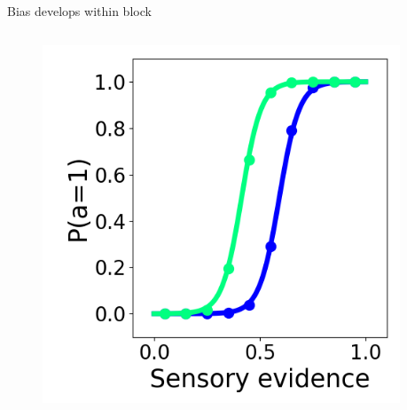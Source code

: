 \documentclass[14pt]{beamer}
\begin{document}
\begin{frame}{Bias develops within block}

\begin{columns}
\begin{column}{0.5\textwidth}

  \begin{figure}
  \includegraphics[width=\textwidth]{images/ptask/avg_psycho}
  \end{figure}

\end{column}
\begin{column}{0.5\textwidth}


\end{column}
\end{columns}
\end{frame}
\end{document}
